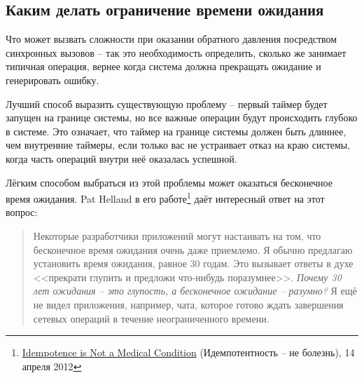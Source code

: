 \documentclass[11pt, oneside]{book}   	%
\begin{document}
  
\subsection{Каким делать ограничение времени ожидания}

Что может вызвать сложности при оказании обратного давления посредством синхронных вызовов -- так это необходимость определить, сколько же занимает типичная операция, вернее когда система должна прекращать ожидание и генерировать ошибку.

Лучший способ выразить существующую проблему -- первый таймер будет запущен на границе системы, но все важные операции будут происходить глубоко в системе. Это означает, что таймер на границе системы должен быть длиннее, чем внутренние таймеры, если только вас не устраивает отказ на краю системы, когда часть операций внутри неё оказалась успешной.

Лёгким способом выбраться из этой проблемы может оказаться бесконечное время ожидания. Pat Helland в его работе\footnote{\href{http://queue.acm.org/detail.cfm?id=2187821}{Idempotence is Not a Medical Condition} (Идемпотентность -- не болезнь), 14 апреля 2012} даёт интересный ответ на этот вопрос:

\begin{quote}
Некоторые разработчики приложений могут настаивать на том, что бесконечное время ожидания очень даже приемлемо. Я обычно предлагаю установить время ожидания, равное 30 годам. Это вызывает ответы в духе <<прекрати глупить и предложи что-нибудь поразумнее>>. \emph{Почему 30 лет ожидания -- это глупость, а бесконечное ожидание -- разумно?} Я ещё не видел приложения, например, чата, которое готово ждать завершения сетевых операций в течение неограниченного времени.
\end{quote}
\end{document}
